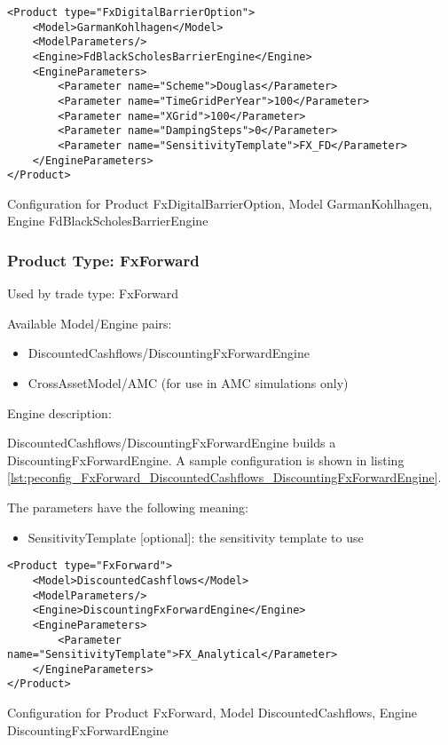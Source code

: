 \begin{longlisting}
\begin{verbatim}
<Product type="FxDigitalBarrierOption">
    <Model>GarmanKohlhagen</Model>
    <ModelParameters/>
    <Engine>FdBlackScholesBarrierEngine</Engine>
    <EngineParameters>
        <Parameter name="Scheme">Douglas</Parameter>
        <Parameter name="TimeGridPerYear">100</Parameter>
        <Parameter name="XGrid">100</Parameter>
        <Parameter name="DampingSteps">0</Parameter>
        <Parameter name="SensitivityTemplate">FX_FD</Parameter>
    </EngineParameters>
</Product>
\end{verbatim}
\caption{Configuration for Product FxDigitalBarrierOption, Model GarmanKohlhagen, Engine FdBlackScholesBarrierEngine}
\label{lst:peconfig_FxDigitalBarrierOption_GarmanKohlhagen_FdBlackScholesBarrierEngine}
\end{longlisting}

\subsubsection{Product Type: FxForward}

Used by trade type: FxForward

Available Model/Engine pairs:

\begin{itemize}
\item DiscountedCashflows/DiscountingFxForwardEngine
\item CrossAssetModel/AMC (for use in AMC simulations only)
\end{itemize}

Engine description:

DiscountedCashflows/DiscountingFxForwardEngine builds a DiscountingFxForwardEngine. A sample configuration is shown in
listing \ref{lst:peconfig_FxForward_DiscountedCashflows_DiscountingFxForwardEngine}.

The parameters have the following meaning:

\begin{itemize}
\item SensitivityTemplate [optional]: the sensitivity template to use 
\end{itemize}

\begin{longlisting}
\begin{verbatim}
<Product type="FxForward">
    <Model>DiscountedCashflows</Model>
    <ModelParameters/>
    <Engine>DiscountingFxForwardEngine</Engine>
    <EngineParameters>
        <Parameter name="SensitivityTemplate">FX_Analytical</Parameter>
    </EngineParameters>
</Product>
\end{verbatim}
\caption{Configuration for Product FxForward, Model DiscountedCashflows, Engine DiscountingFxForwardEngine}
\label{lst:peconfig_FxForward_DiscountedCashflows_DiscountingFxForwardEngine}
\end{longlisting}

